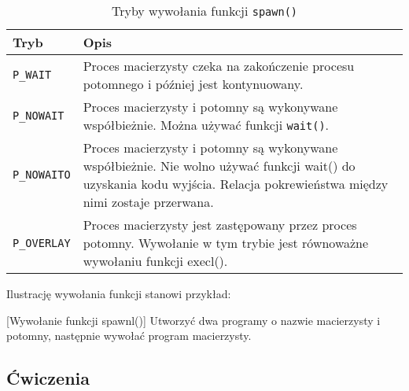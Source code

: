 \begin{table}
  \caption{Tryby wywołania funkcji \texttt{spawn()}}
  \label{tab:V0CUU}
  \begin{tabular}{|l|p{}|}
    \hline
    \textbf{Tryb}       & \textbf{Opis}
    \\ \hline
    \texttt{P\_WAIT}    & Proces macierzysty czeka na zakończenie procesu
                          potomnego i później jest kontynuowany.
    \\ \hline
    \texttt{P\_NOWAIT}  & Proces macierzysty i potomny są wykonywane
                          współbieżnie. Można używać funkcji \texttt{wait()}.
    \\ \hline
    \texttt{P\_NOWAITO} & Proces macierzysty i potomny są wykonywane
                          współbieżnie. Nie wolno używać funkcji wait() do
                          uzyskania kodu wyjścia. Relacja pokrewieństwa między
                          nimi zostaje przerwana.
    \\ \hline
    \texttt{P\_OVERLAY} & Proces macierzysty jest zastępowany przez proces
                          potomny. Wywołanie w tym trybie jest równoważne
                          wywołaniu funkcji execl().
    \\ \hline
  \end{tabular}
\end{table}

Ilustrację wywołania funkcji stanowi przykład:

\begin{example}{[Wywołanie funkcji spawnl()]}
  \label{ex:VSCD0}
  Utworzyć  dwa programy o nazwie macierzysty i potomny, następnie wywołać
  program macierzysty.
  
  
\end{example}


\subsection{Ćwiczenia}

